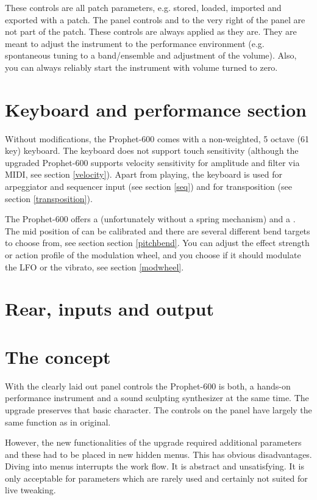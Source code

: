 \documentclass[landscape, 11pt, oneside, twoside]{report}
\newenvironment{flowtext}{\addmargin[0cm]{0cm}}{\endaddmargin} %
\begin{document}
\begin{flowtext}
These controls are all patch parameters, e.g. stored, loaded, imported and exported with a patch. The panel controls \mastertune and \mastervol to the very right of the panel are not part of the patch. These controls are always applied as they are. They are meant to adjust the instrument to the performance environment (e.g. spontaneous tuning to a band/ensemble and adjustment of the volume). Also, you can always reliably start the instrument with volume turned to zero.

\section{Keyboard and performance section}

Without modifications, the Prophet-600 comes with a non-weighted, 5 octave (61 key) keyboard. The keyboard does not support touch sensitivity (although the upgraded Prophet-600 supports velocity sensitivity for amplitude and filter via MIDI, see section \ref{velocity}). Apart from playing, the keyboard is used for arpeggiator and sequencer input (see section \ref{seq}) and for transposition (see section \ref{transposition}). 

The Prophet-600 offers a \pitchbender (unfortunately without a spring mechanism) and a \modwheel. The mid position of \pitchbender can be calibrated and there are several different bend targets to choose from, see section section \ref{pitchbend}. You can adjust the effect strength or action profile of the modulation wheel, and you choose if it should modulate the LFO or the vibrato, see section \ref{modwheel}.

\section{Rear, inputs and output}



\section{The concept}

With the clearly laid out panel controls the Prophet-600 is both, a hands-on performance instrument and a sound sculpting synthesizer at the same time. The upgrade preserves that basic character. The controls on the panel have largely the same function as in original. 

However, the new functionalities of the upgrade required additional parameters and these had to be placed in new hidden menus. This has obvious disadvantages. Diving into menus interrupts the work flow. It is abstract and unsatisfying. It is only acceptable for parameters which are rarely used and certainly not suited for live tweaking. 


\end{flowtext}
\end{document}
